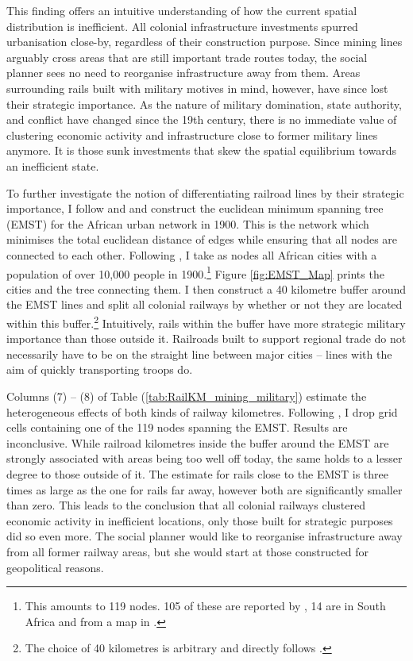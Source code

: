 \documentclass[11pt, oneside]{article}   	%
\let\oldref\ref
\renewcommand{\ref}[1]{(\oldref{#1})}
\begin{document}
This finding offers an intuitive understanding of how the current spatial distribution is inefficient. All colonial infrastructure investments spurred urbanisation close-by, regardless of their construction purpose. Since mining lines arguably cross areas that are still important trade routes today, the social planner sees no need to reorganise infrastructure away from them. Areas surrounding rails built with military motives in mind, however, have since lost their strategic importance. As the nature of military domination, state authority, and conflict have changed since the 19th century, there is no immediate value of clustering economic activity and infrastructure close to former military lines anymore. It is those sunk investments that skew the spatial equilibrium towards an inefficient state.

To further investigate the notion of differentiating railroad lines by their strategic importance, I follow \cite{jedwab_permanent_2016} and \cite{faber_trade_2014} and construct the euclidean minimum spanning tree (EMST) for the African urban network in 1900. This is the network which minimises the total euclidean distance of edges while ensuring that all nodes are connected to each other. Following \citeauthor{jedwab_permanent_2016}, I take as nodes all African cities with a population of over 10,000 people in 1900.\footnote{This amounts to 119 nodes. 105 of these are reported by \cite{jedwab_permanent_2016}, 14 are in South Africa and from a map in \cite{Herranz-Loncan_publicbenefitRailways_2017}.} Figure \eqref{fig:EMST_Map} prints the cities and the tree connecting them. I then construct a 40 kilometre buffer around the EMST lines and split all colonial railways by whether or not they are located within this buffer.\footnote{The choice of 40 kilometres is arbitrary and directly follows \cite{jedwab_permanent_2016}.} Intuitively, rails within the buffer have more strategic military importance than those outside it. Railroads built to support regional trade do not necessarily have to be on the straight line between major cities -- lines with the aim of quickly transporting troops do.

Columns (7) -- (8) of Table \ref{tab:RailKM_mining_military} estimate the heterogeneous effects of both kinds of railway kilometres. Following \citeauthor{jedwab_permanent_2016}, I drop grid cells containing one of the 119 nodes spanning the EMST. Results are inconclusive. While railroad kilometres inside the buffer around the EMST are strongly associated with areas being too well off today, the same holds to a lesser degree to those outside of it. The estimate for rails close to the EMST is three times as large as the one for rails far away, however both are significantly smaller than zero. This leads to the conclusion that all colonial railways clustered economic activity in inefficient locations, only those built for strategic purposes did so even more. The social planner would like to reorganise infrastructure away from all former railway areas, but she would start at those constructed for geopolitical reasons.
\end{document}
